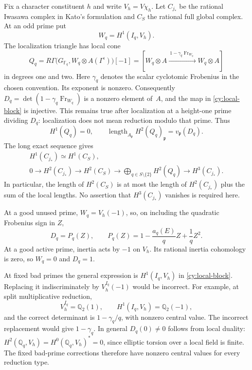 Fix a character constituent $h$ and write $V_h=V\chi_h$.  Let $C_{j_*}$
be the rational Iwasawa complex in Kato's formulation and $C_S$ the
rational full global complex.  At an odd prime put
\[
 W_q=H^1(I_q,V_h).
\]
The localization triangle has local cone
\begin{equation}\label{cy:local-block}
 Q_q=R\Gamma\bigl(G_{\mathbb F _q},
                   W_q\otimes A(\Gamma^\iota)\bigr)[-1]
   =\left[W_q\otimes A
       \xrightarrow{\ 1-\gamma_q\operatorname{Fr}_{W_q}\ }
             W_q\otimes A\right]
\end{equation}
in degrees one and two.  Here $\gamma_q$ denotes the scalar cyclotomic
Frobenius in the chosen convention.  Its exponent is nonzero.  Consequently
$D_q=\det(1-\gamma_q\operatorname{Fr}_{W_q})$ is a nonzero element of~$A$,
and the map in \eqref{cy:local-block} is injective.  This remains true
after localization at a height-one prime dividing $D_q$: localization
does not mean reduction modulo that prime.  Thus
\[
 H^1(Q_q)=0,\qquad
 \operatorname{length}_{A_{\mathfrak p}}H^2(Q_q)_{\mathfrak p}
       =v_{\mathfrak p}(D_q).
\]
The long exact sequence gives
\begin{equation}\label{cy:local-sequence}
 \begin{gathered}
 H^1(C_{j_*})\simeq H^1(C_S),\\
 0\longrightarrow H^2(C_{j_*})\longrightarrow H^2(C_S)
       \longrightarrow\bigoplus_{q\in S\setminus\{2\}}H^2(Q_q)
       \longrightarrow H^3(C_{j_*}).
 \end{gathered}
\end{equation}
In particular, the length of $H^2(C_S)$ is at most the length of
$H^2(C_{j_*})$ plus the sum of the local lengths.  No assertion that
$H^3(C_{j_*})$ vanishes is required here.

At a good unused prime, $W_q=V_h(-1)$, so, on including the quadratic
Frobenius sign in $Z$,
\begin{equation}\label{cy:good-euler}
 D_q=P_q(Z),\qquad P_q(Z)=1-\frac{a_q(E)}q Z+\frac1q Z^2.
\end{equation}
At a good active prime, inertia acts by $-1$ on $V_h$.  Its rational
inertia cohomology is zero, so $W_q=0$ and $D_q=1$.

At fixed bad primes the general expression is $H^1(I_q,V_h)$ in
\eqref{cy:local-block}.  Replacing it indiscriminately by $V_h^{I_q}(-1)$
would be incorrect.  For example, at split multiplicative reduction,
\[
 V_h^{I_q}=\mathbb Q _2(1),\qquad
 H^1(I_q,V_h)=\mathbb Q _2(-1),
\]
and the correct determinant is $1-\gamma_q/q$, with nonzero central
value.  The incorrect replacement would give $1-\gamma_q$.
In general $D_q(0)\ne0$ follows from local duality:
$H^2(\mathbb Q _q,V_h)=H^0(\mathbb Q _q,V_h)^*=0$, since elliptic torsion
over a local field is finite.  The fixed bad-prime corrections therefore
have nonzero central values for every reduction type.

